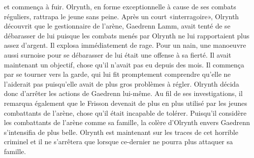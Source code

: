 \documentclass[main.tex]{subfiles}
\begin{document}
    et commença à fuir. Olrynth, en forme exceptionnelle à cause de ses combats réguliers, rattrapa le jeune
    sans peine. Après un court «interragoire», Olrynth découvrit que le gestionnaire de l'arène, Gaedrenn Lamm,
    avait tenté de se débarasser de lui puisque les combats menés par Olrynth ne lui rapportaient plus assez
    d'argent. Il explosa immédiatement de rage. Pour un nain, une manoeuvre aussi surnoise pour se débarasser
    de lui était une offense à sa fierté. Il avait maintenant un objectif, chose qu'il n'avait pas eu depuis des
    mois. Il commença par se tourner vers la garde, qui lui fit promptement comprendre qu'elle ne l'aiderait pas
    puisqu'elle avait de plus gros problèmes à régler. Olrynth décida donc d'arrêter les actions de Gaedrenn
    lui-même. Au fil de ses investigations, il remarqua également que le Frisson devenait de plus en plus 
    utilisé par les jeunes combattants de l'arène, chose qu'il était incapable de tolérer. Puisqu'il considère 
    les combattants de l'arène comme sa famille, la colère d'Olrynth envers Gaedrenn s'intensifia de plus 
    belle. Olrynth est maintenant sur les traces de cet horrible criminel et il ne s'arrêtera que lorsque 
    ce-dernier ne pourra plus attaquer sa famille.
\end{document}
